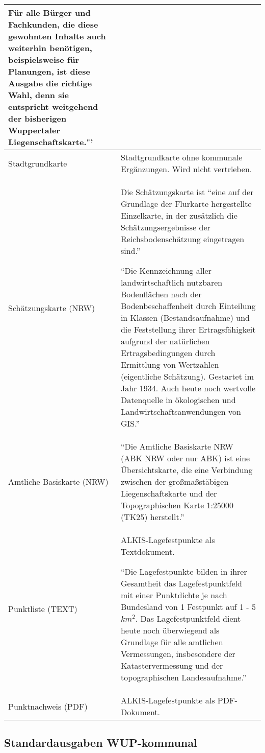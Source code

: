 \begin{longtable}{|p{}|p{}|}
	Für alle Bürger und Fachkunden, die diese gewohnten Inhalte auch weiterhin benötigen, beispielsweise für Planungen, ist diese Ausgabe die richtige Wahl, denn sie entspricht weitgehend der bisherigen Wuppertaler Liegenschaftskarte."' \autocite{wupp-alkis} \\
	\hline			
	Stadtgrundkarte
	&
	Stadtgrundkarte ohne kommunale Ergänzungen. Wird nicht vertrieben. \\
	\hline
	Schätzungskarte (NRW)
	&
	Die Schätzungskarte ist "`eine auf der Grundlage der Flurkarte hergestellte Einzelkarte, in der zusätzlich die Schätzungsergebnisse der Reichsbodenschätzung eingetragen sind."'  \autocite{gg-schaetzungskarte}
						
	"`Die Kennzeichnung aller landwirtschaftlich nutzbaren Bodenflächen nach der Bodenbeschaffenheit durch Einteilung in Klassen (Bestandsaufnahme) und die Feststellung ihrer Ertragsfähigkeit aufgrund der natürlichen Ertragsbedingungen durch Ermittlung von Wertzahlen (eigentliche Schätzung). Gestartet im Jahr 1934. Auch heute noch wertvolle Datenquelle in ökologischen und Landwirtschaftsanwendungen von GIS."' \autocite{gg-reichsbodenschaetzung} \\
						
	\hline
	Amtliche Basiskarte (NRW)
	&
	"`Die Amtliche Basiskarte NRW (ABK NRW oder nur ABK) ist eine Übersichtskarte, die eine Verbindung zwischen der großmaßstäbigen Liegenschaftskarte und der Topographischen Karte 1:25000 (TK25) herstellt."' \todo{quelle:(wikipedia)} \\
	\hline
	Punktliste (TEXT)
	&
	ALKIS-Lagefestpunkte als Textdokument.
						
	"`Die Lagefestpunkte bilden in ihrer Gesamtheit das Lagefestpunktfeld mit einer Punktdichte je nach Bundesland von 1 Festpunkt auf 1 - 5 $km^2$. Das Lagefestpunktfeld dient heute noch überwiegend als Grundlage für alle amtlichen Vermessungen, insbesondere der Katastervermessung und der topographischen Landesaufnahme."' \autocite{adv-lagefestpunkte}\\
	\hline
	Punktnachweis (PDF)
	&
	ALKIS-Lagefestpunkte als PDF-Dokument. \\
	\hline
\end{longtable} 
\label{tab-alkis-standard-end}
	
\subsection{Standardausgaben WUP-kommunal}

